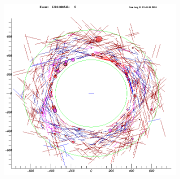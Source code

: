 \begin{figure}[!h]
\begin{subfigure}[b]{0.7\linewidth}
        \includegraphics[scale = 0.3]{figures/png/Screenshot_20240811_124245.png}
        \label{fig:af}
    \end{subfigure} 
\end{figure}
